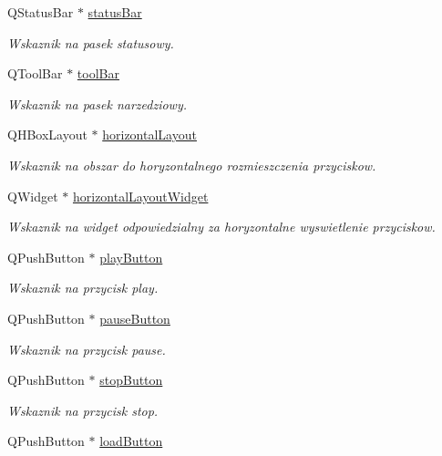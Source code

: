 \begin{DoxyCompactItemize}
Q\-Status\-Bar $\ast$ \hyperlink{class_okno_glowne_a40a10989bc6b318ac24e2457d7adb53b}{status\-Bar}
\begin{DoxyCompactList}\small\item\em Wskaznik na pasek statusowy. \end{DoxyCompactList}\item 
Q\-Tool\-Bar $\ast$ \hyperlink{class_okno_glowne_a6a37dd1f32605092fff7feac712bf429}{tool\-Bar}
\begin{DoxyCompactList}\small\item\em Wskaznik na pasek narzedziowy. \end{DoxyCompactList}\item 
Q\-H\-Box\-Layout $\ast$ \hyperlink{class_okno_glowne_aacb5ddb6d0eb560a47917cc1b457239a}{horizontal\-Layout}
\begin{DoxyCompactList}\small\item\em Wskaznik na obszar do horyzontalnego rozmieszczenia przyciskow. \end{DoxyCompactList}\item 
Q\-Widget $\ast$ \hyperlink{class_okno_glowne_a12ac2d00b9ca186176ccc710a928a723}{horizontal\-Layout\-Widget}
\begin{DoxyCompactList}\small\item\em Wskaznik na widget odpowiedzialny za horyzontalne wyswietlenie przyciskow. \end{DoxyCompactList}\item 
Q\-Push\-Button $\ast$ \hyperlink{class_okno_glowne_a50f936486c1bc3b3278823a8eb90841e}{play\-Button}
\begin{DoxyCompactList}\small\item\em Wskaznik na przycisk play. \end{DoxyCompactList}\item 
Q\-Push\-Button $\ast$ \hyperlink{class_okno_glowne_a0dde8df8a49b8f47f17f8e748fd15967}{pause\-Button}
\begin{DoxyCompactList}\small\item\em Wskaznik na przycisk pause. \end{DoxyCompactList}\item 
Q\-Push\-Button $\ast$ \hyperlink{class_okno_glowne_a3051d73dc0e0a27dc30ada43cc6b63c4}{stop\-Button}
\begin{DoxyCompactList}\small\item\em Wskaznik na przycisk stop. \end{DoxyCompactList}\item 
Q\-Push\-Button $\ast$ \hyperlink{class_okno_glowne_accbadc3bc4d418cfe1bce2be61881917}{load\-Button}

\end{DoxyCompactItemize}
